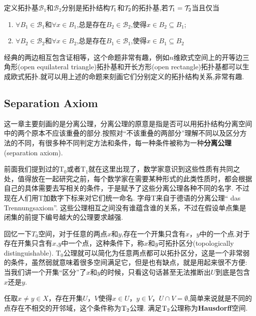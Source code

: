 \begin{proposition}
定义拓扑基$\mathscr{B}_1$和$\mathscr{B}_2$分别是拓扑结构$\mathcal{T}_1$和$\mathcal{T}_2$的拓扑基,若$\mathcal{T}_1 = \mathcal{T}_2$当且仅当
\begin{enumerate}
	\item $\forall B_1 \in \mathscr{B}_1$和$\forall x \in B_1$,总是存在$B_2 \in \mathscr{B}_2$,使得$x \in B_2 \subseteq B_1$;
	\item $\forall B_2 \in \mathscr{B}_2$和$\forall x \in B_2$,总是存在$B_1 \in \mathscr{B}_1$,使得$x \in B_1 \subseteq B_2$
\end{enumerate}
\end{proposition}

经典的两边相互包含证相等，这个命题非常有趣，例如$n$维欧式空间上的开等边三角形(open equilateral triangle)拓扑基和开长方形(open  rectangle)拓扑基都可以生成欧式拓扑.就可以用上述的命题来刻画它们分别定义的拓扑结构关系,非常有趣.

\newpage

\subsection{Separation Axiom}

这一章主要刻画的是分离公理，分离公理的原意是指是否可以用拓扑结构分离空间中的两个原本不应该重叠的部分.按照对“不该重叠的两部分”理解不同以及区分方法的不同，有很多种不同判定方法和条件，每一种条件被称为一种\textbf{分离公理}(separation axiom).

前面我们提到过的$\text{T}_0$或者$\text{T}_1$就在这里出现了，数学家意识到这些性质有共同之处，值得放在一起研究之前，每个数学家在需要某种形式的此类性质时，都会根据自己的具体需要去写相关的条件，于是赋予了这些分离公理各种不同的名字. 不过现在人们用T加数字下标来对它们统一命名. 字母T来自于德语的分离公理“	das Trennungsaxiom”. 这些公理相互之间没有谁蕴含谁的关系，不过在假设单点集是闭集的前提下编号越大的公理要求越强. 

回忆一下$T_0$空间，对于任意的两点$x$和$y$,存在一个开集只含有$x$，$y$中的一个点.对于存在开集只含有$x$,$y$中一个点，这种条件下，称$x$和$y$可拓扑区分(topologically distinguishable). $\text{T}_0$公理就可以简化为任意两点都可以拓扑区分，这是一个非常弱的条件，虽然弱就意味着很多空间满足它，但是也有缺点，就是用起来很不方便: 当我们讲一个开集“区分”了$x$和$y$的时候，只看这句话甚至无法推断出$U$到底是包含$x$还是$y$.

\begin{definition}
任取$x \neq y \in X$，存在开集$U$，$V$使得$x \in U$，$y \in V$，$U \cap V = \emptyset$,简单来说就是不同的点存在不相交的开邻域，这个条件称为$\rm T_2$公理. 满足$\rm T_2$公理称为\rm\textbf{Hausdorff}空间.
\end{definition}

